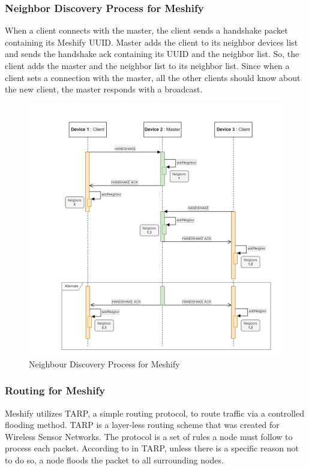 \subsubsection{Neighbor Discovery Process for Meshify}

When a client connects with the master, the client sends a handshake packet
containing its Meshify UUID. Master adds the client to its neighbor devices
list and sends the handshake ack containing its UUID and the neighbor list. So,
the client adds the master and the neighbor list to its neighbor list. Since
when a client sets a connection with the master, all the other clients should
know about the new client, the master responds with a
broadcast\cite{gunasekara2022}.

\begin{figure}[htbp]
    \centerline{\includegraphics[height=0.75\textwidth]{imgs/neighbourdis.png}}
    \caption{Neighbour Discovery Process for Meshify\cite{gunasekara2022}}
    \label{neighbourdis}
\end{figure}

\subsubsection{Routing for Meshify}

Meshify utilizes TARP, a simple routing protocol, to route traffic via a
controlled flooding method. TARP is a layer-less routing scheme that was
created for Wireless Sensor Networks. The protocol is a set of rules a node
must follow to process each packet\cite{gunasekara2022}. According to
\cite{wsn2021} in TARP, unless there is a specific reason not to do so, a node
floods the packet to all surrounding nodes.

